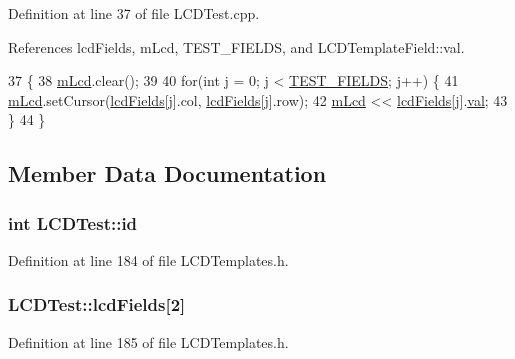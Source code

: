 Definition at line 37 of file L\-C\-D\-Test.\-cpp.



References lcd\-Fields, m\-Lcd, T\-E\-S\-T\-\_\-\-F\-I\-E\-L\-D\-S, and L\-C\-D\-Template\-Field\-::val.


\begin{DoxyCode}
37                             \{
38   \hyperlink{class_l_c_d_test_a4d8379716e37edc20fafb9c4a24c253f}{mLcd}.clear();
39 
40   \textcolor{keywordflow}{for}(\textcolor{keywordtype}{int} j = 0; j < \hyperlink{_l_c_d_templates_8h_a3f6d6cdb1650f9872fb2520b149c4902}{TEST\_FIELDS}; j++) \{
41     \hyperlink{class_l_c_d_test_a4d8379716e37edc20fafb9c4a24c253f}{mLcd}.setCursor(\hyperlink{class_l_c_d_test_ab14e67bbc0e88f2395d8fd52d1826423}{lcdFields}[j].col, \hyperlink{class_l_c_d_test_ab14e67bbc0e88f2395d8fd52d1826423}{lcdFields}[j].row);
42     \hyperlink{class_l_c_d_test_a4d8379716e37edc20fafb9c4a24c253f}{mLcd} << \hyperlink{class_l_c_d_test_ab14e67bbc0e88f2395d8fd52d1826423}{lcdFields}[j].\hyperlink{struct_l_c_d_template_field_a6eb7ce0547fc28ac3a2538f0fac3f117}{val};
43   \}
44 \}
\end{DoxyCode}


\subsection{Member Data Documentation}
\hypertarget{class_l_c_d_test_a2ff27dfccb55b9a130732f8bafbd2638}{
\subsubsection[{id}]{\setlength{\rightskip}{0pt plus 5cm}int L\-C\-D\-Test\-::id}}\label{class_l_c_d_test_a2ff27dfccb55b9a130732f8bafbd2638}


Definition at line 184 of file L\-C\-D\-Templates.\-h.

\hypertarget{class_l_c_d_test_ab14e67bbc0e88f2395d8fd52d1826423}{
\subsubsection[{lcd\-Fields}]{ L\-C\-D\-Test\-::lcd\-Fields\mbox{[}2\mbox{]}}}\label{class_l_c_d_test_ab14e67bbc0e88f2395d8fd52d1826423}


Definition at line 185 of file L\-C\-D\-Templates.\-h.




